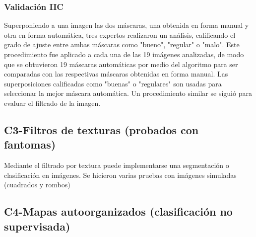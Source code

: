  

 


\subsubsection{Validación IIC} \label{Validacion}
Superponiendo a una imagen las dos máscaras, una obtenida en forma manual y otra en forma automática, tres expertos realizaron un análisis, calificando el grado de ajuste entre ambas máscaras como "bueno", "regular" o "malo". Este procedimiento fue aplicado a cada una de las 19 imágenes analizadas, de modo que se obtuvieron 19 máscaras automáticas por medio del algoritmo para ser comparadas con las respectivas máscaras obtenidas en forma manual. Las superposiciones calificadas como "buenas" o "regulares" son usadas para seleccionar la mejor máscara automática. Un procedimiento similar se siguió para evaluar el filtrado de la imagen.

\color{orange} %
\subsection{C3-Filtros de texturas (probados con fantomas)}
Mediante el filtrado por textura puede implementarse una segmentación o clasificación en imágenes. Se hicieron varias pruebas con imágenes simuladas (cuadrados y rombos)
\subsection{C4-Mapas autoorganizados (clasificación no supervisada)}
